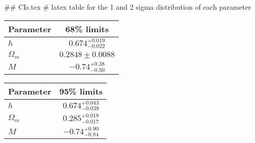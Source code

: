 ## CIs.tex
# latex table for the 1 and 2 sigma distribution of each parameter

\begin{tabular} { l  c}
 Parameter &  68\% limits\\
\hline
{\boldmath$h              $} & $0.674^{+0.019}_{-0.022}   $\\
{\boldmath$\Omega_m       $} & $0.2848\pm 0.0088          $\\
{\boldmath$M              $} & $-0.74^{+0.38}_{-0.50}     $\\
\hline
\end{tabular}

\begin{tabular} { l  c}
 Parameter &  95\% limits\\
\hline
{\boldmath$h              $} & $0.674^{+0.043}_{-0.039}   $\\
{\boldmath$\Omega_m       $} & $0.285^{+0.018}_{-0.017}   $\\
{\boldmath$M              $} & $-0.74^{+0.90}_{-0.84}     $\\
\hline
\end{tabular}
